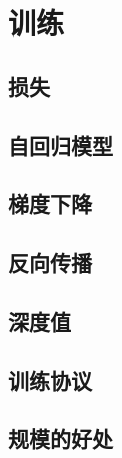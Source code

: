 \chapter{训练}

\section{损失}

\section{自回归模型}

\section{梯度下降}

\section{反向传播}

\section{深度值}\label{sec3.6}

\section{训练协议}\label{sec3.7}

\section{规模的好处}